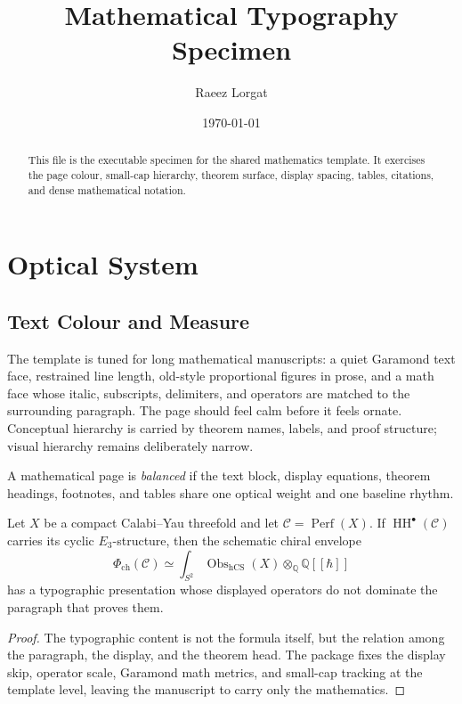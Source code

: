 \documentclass[11pt]{memoir}
\title{Mathematical Typography Specimen}
\author{Raeez Lorgat}
\date{\today}
\begin{document}
\maketitle

\begin{abstract}
This file is the executable specimen for the shared mathematics template.
It exercises the page colour, small-cap hierarchy, theorem surface, display
spacing, tables, citations, and dense mathematical notation.
\end{abstract}

\tableofcontents

\chapter{Optical System}

\section{Text Colour and Measure}

The template is tuned for long mathematical manuscripts: a quiet Garamond
text face, restrained line length, old-style proportional figures in prose,
and a math face whose italic, subscripts, delimiters, and operators are
matched to the surrounding paragraph.  The page should feel calm before it
feels ornate.  Conceptual hierarchy is carried by theorem names, labels, and
proof structure; visual hierarchy remains deliberately narrow.

\begin{definition}
A mathematical page is \emph{balanced} if the text block, display equations,
theorem headings, footnotes, and tables share one optical weight and one
baseline rhythm.
\end{definition}

\begin{theorem}
Let $X$ be a compact Calabi--Yau threefold and let
$\mathcal C = \operatorname{Perf}(X)$.  If
$\operatorname{HH}^{\bullet}(\mathcal C)$ carries its cyclic
$E_3$-structure, then the schematic chiral envelope
\[
  \Phi_{\mathrm{ch}}(\mathcal C)
  \simeq
  \int_{S^2}
  \operatorname{Obs}_{\mathrm{hCS}}(X)
  \otimes_{\mathbb Q}
  \mathbb Q[[\hbar]]
\]
has a typographic presentation whose displayed operators do not dominate
the paragraph that proves them.
\end{theorem}

\begin{proof}
The typographic content is not the formula itself, but the relation among
the paragraph, the display, and the theorem head.  The package fixes the
display skip, operator scale, Garamond math metrics, and small-cap tracking
at the template level, leaving the manuscript to carry only the mathematics.
\end{proof}
\end{document}
